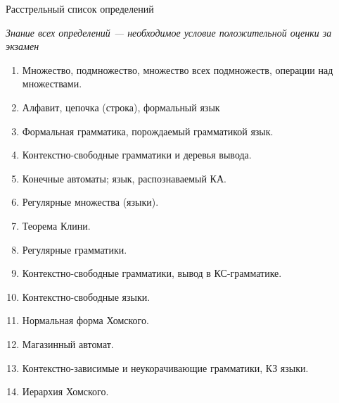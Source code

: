 \documentclass[12pt]{article}
\newcommand{\litem}[1]{\item #1 }%
\begin{document}
\begin{center}
{\LARGE Расстрельный список определений}

{\emph{ Знание всех определений --- необходимое условие положительной оценки за экзамен }}
\end{center}


\bigskip
\begin{enumerate}
  \litem {Множество, подмножество, множество всех подмножеств, операции над множествами.}
  \litem {Алфавит, цепочка (строка), формальный язык} 
  \litem {Формальная грамматика, порождаемый грамматикой язык.}
  \litem {Контекстно-свободные грамматики и деревья вывода.}
  \litem {Конечные автоматы; язык, распознаваемый КА. }
  \litem {Регулярные множества (языки). }
  \litem {Теорема Клини.}
  \litem {Регулярные грамматики.}
  \litem {Контекстно-свободные грамматики, вывод в КС-грамматике.}
  \litem {Контекстно-свободные языки.}
  \litem {Нормальная форма Хомского.}
  \litem {Магазинный автомат.}
  \litem {Контекстно-зависимые и неукорачивающие грамматики, КЗ языки.}
  \litem {Иерархия Хомского.}
\end{enumerate}
\end{document}

